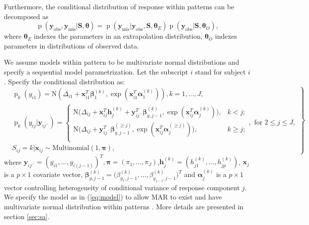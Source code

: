 \documentclass[12pt]{article}
\DeclareMathOperator{\pr}{p}
\newcommand{\yobs}{\bm y_{\text{obs}}}
\newcommand{\ymis}{\bm y_{\text{mis}}}
\begin{document}
Furthermore, the conditional distribution of response within patterns
can be decomposed as
\begin{displaymath} \pr (\yobs, \ymis | \bm S, \bm \theta) = \pr
  (\ymis|\yobs, \bm S, \bm \theta_E) \pr (\yobs | \bm S, \bm
  \theta_O),
\end{displaymath}
where $\bm \theta_E$ indexes the parameters in an extrapolation
distribution, $\bm \theta_O$ indexes parameters in distributions of
observed data.

We assume models within pattern to be multivariate normal
distributions and specify a sequential model parametrization. Let the
subscript $i$ stand for subject $i$. Specify the conditional
distribution as:
\begin{equation}
  \label{eq:model}
  \left.  \begin{aligned}
      & \pr_k(y_{i1}) = \textrm{N} (\Delta_{i1} + \bm x_{i1}^T \bm \beta_1^{(k)},
      \exp (\bm x_{i1}^T \bm \alpha_1^{(k)} ) ), k = 1, \ldots, J,\\
      &\pr_k(y_{ij}|\bm y_{ij^{-}}) =
      \begin{cases}
        \textrm{N} \big (\Delta_{ij} + \bm x_{ij}^T \bm h_{j}^{(k)} +
        \bm y_{ij^{-}}^T \bm \beta_{y,j-1}^{(k)},
        \exp (\bm x_{ij}^T \bm \alpha_j^{(k)} ) \big), & k < j ;  \\
        \textrm{N} \big (\Delta_{ij} + \bm y_{ij^{-}}^T \bm
        \beta_{y,j-1}^{(\geq j)},
        \exp (\bm x_{ij}^T \bm \alpha_j^{(\geq j)} ) \big), & k \geq j ;  \\
      \end{cases}, \text{ for } 2 \leq j \leq J,  \\
      &S_{ij} = k| \bm x_{ij} \sim \textrm{Multinomial}(1, \bm \pi),
    \end{aligned} \right\}
\end{equation}
where $\bm y_{ij^{-}} = (y_{i1}, \ldots, y_{i(j-1)})^T, \bm \pi =
(\pi_1, \ldots, \pi_J)$,$\bm h_j^{(k)} = (h_{j1}^{(k)}, \ldots,
h_{jp}^{(k)})$, $\bm x_j$ is a $p \times 1$ covariate vector, $\bm
\beta_{y, j-1}^{(k)} = \big(\beta_{y_1, j-1}^{(k)}, \ldots,
\beta_{y_{j-1}, j-1}^{(k)} \big)^T$ and $\bm \alpha_j^{(k)}$ is a $p
\times 1$ vector controlling heterogeneity of conditional variance of
response component $j$. We specify the model as in (\ref{eq:model}) to
allow MAR to exist and have multivariate normal distribution within
patterns \citep{wang2011}. More details are presented in section
\ref{sec:sa}.
\end{document}
